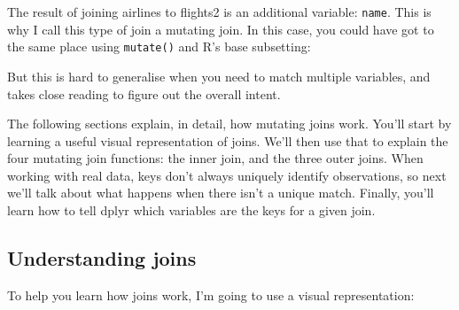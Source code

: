 \documentclass[]{book}
\newenvironment{Shaded}{\begin{snugshade}}{\end{snugshade}}
\newcommand{\KeywordTok}[1]{\textcolor[rgb]{0.13,0.29,0.53}{\textbf{{#1}}}}
\newcommand{\DataTypeTok}[1]{\textcolor[rgb]{0.13,0.29,0.53}{{#1}}}
\newcommand{\StringTok}[1]{\textcolor[rgb]{0.31,0.60,0.02}{{#1}}}
\newcommand{\CommentTok}[1]{\textcolor[rgb]{0.56,0.35,0.01}{\textit{{#1}}}}
\newcommand{\NormalTok}[1]{{#1}}
\begin{document}
The result of joining airlines to flights2 is an additional variable:
\texttt{name}. This is why I call this type of join a mutating join. In
this case, you could have got to the same place using \texttt{mutate()}
and R's base subsetting:

\begin{Shaded}
\end{Shaded}

But this is hard to generalise when you need to match multiple
variables, and takes close reading to figure out the overall intent.

The following sections explain, in detail, how mutating joins work.
You'll start by learning a useful visual representation of joins. We'll
then use that to explain the four mutating join functions: the inner
join, and the three outer joins. When working with real data, keys don't
always uniquely identify observations, so next we'll talk about what
happens when there isn't a unique match. Finally, you'll learn how to
tell dplyr which variables are the keys for a given join.

\subsection{Understanding joins}\label{understanding-joins}

To help you learn how joins work, I'm going to use a visual
representation:
\end{document}
